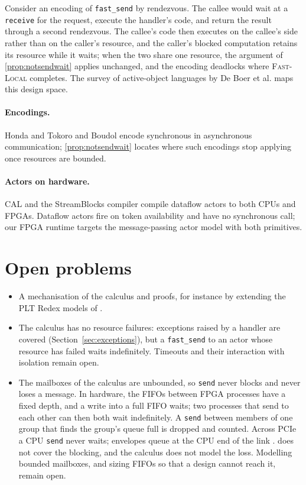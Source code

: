 \documentclass[11pt]{article}
\theoremstyle{definition}
\theoremstyle{remark}
\newcommand{\fs}{\texttt{fast\_send}}
\newcommand{\snd}{\texttt{send}}
\begin{document}
Consider an encoding of \fs{} by rendezvous. The callee would wait at a
\texttt{receive} for the request, execute the handler's code, and return the result
through a second rendezvous. The callee's code then executes on the callee's side rather
than on the caller's resource, and the caller's blocked computation retains its resource
while it waits; when the two share one resource, the argument of \cref{prop:notsendwait}
applies unchanged, and the encoding deadlocks where \textsc{Fast-Local} completes. The
survey of active-object languages by De Boer et al.
\cite{deboer2017survey} maps this design space.

\paragraph{Encodings.} Honda and Tokoro \cite{hondatokoro1991} and Boudol
\cite{boudol1992} encode synchronous in asynchronous communication; \cref{prop:notsendwait}
locates where such encodings stop applying once resources are bounded.

\paragraph{Actors on hardware.} CAL and the StreamBlocks compiler
\cite{bezati2021streamblocks} compile dataflow actors to both CPUs and FPGAs. Dataflow
actors fire on token availability and have no synchronous call; our FPGA runtime targets
the message-passing actor model with both primitives.

\section{Open problems}
\label{sec:future}

\begin{itemize}[leftmargin=1.4em]
  \item A mechanisation of the calculus and proofs, for instance by extending the PLT
  Redex models of \cite{dekoster2024}.
  \item The calculus has no resource failures: exceptions raised by a handler are covered
  (Section~\ref{sec:exceptions}), but a \fs{} to an actor whose resource has failed waits
  indefinitely. Timeouts and their interaction with isolation remain open.
  \item The mailboxes of the calculus are unbounded, so \snd{} never blocks and never
  loses a message. In hardware, the FIFOs between FPGA processes have a fixed depth, and a
  write into a full FIFO waits; two processes that send to each other can then both wait
  indefinitely. A \snd{} between members of one group that finds the group's queue full is
  dropped and counted. Across PCIe a CPU \snd{} never waits; envelopes queue at the CPU
  end of the link \cite{fpgaactors}.  does not cover the blocking,
  and the calculus does not model the loss. Modelling bounded mailboxes, and sizing FIFOs
  so that a design cannot reach it, remain open.
\end{itemize}
\end{document}
